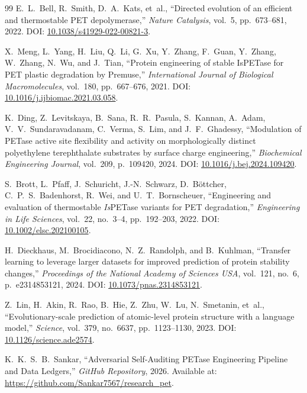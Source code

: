 \documentclass[11pt,a4paper]{article}
\begin{document}
\begin{thebibliography}{99}
E.~L.~Bell, R.~Smith, D.~A.~Kats, et~al.,
``Directed evolution of an efficient and thermostable PET depolymerase,''
\textit{Nature Catalysis}, vol.~5, pp.~673--681, 2022.
\newblock DOI: \href{https://doi.org/10.1038/s41929-022-00821-3}{10.1038/s41929-022-00821-3}.

X.~Meng, L.~Yang, H.~Liu, Q.~Li, G.~Xu, Y.~Zhang, F.~Guan, Y.~Zhang, W.~Zhang, N.~Wu, and J.~Tian,
``Protein engineering of stable IsPETase for PET plastic degradation by Premuse,''
\textit{International Journal of Biological Macromolecules}, vol.~180, pp.~667--676, 2021.
\newblock DOI: \href{https://doi.org/10.1016/j.ijbiomac.2021.03.058}{10.1016/j.ijbiomac.2021.03.058}.

K.~Ding, Z.~Levitskaya, B.~Sana, R.~R.~Pasula, S.~Kannan, A.~Adam, V.~V.~Sundaravadanam, C.~Verma, S.~Lim, and J.~F.~Ghadessy,
``Modulation of PETase active site flexibility and activity on morphologically distinct polyethylene terephthalate substrates by surface charge engineering,''
\textit{Biochemical Engineering Journal}, vol.~209, p.~109420, 2024.
\newblock DOI: \href{https://doi.org/10.1016/j.bej.2024.109420}{10.1016/j.bej.2024.109420}.

S.~Brott, L.~Pfaff, J.~Schuricht, J.-N.~Schwarz, D.~B\"ottcher, C.~P.~S.~Badenhorst, R.~Wei, and U.~T.~Bornscheuer,
``Engineering and evaluation of thermostable \textit{Is}PETase variants for PET degradation,''
\textit{Engineering in Life Sciences}, vol.~22, no.~3--4, pp.~192--203, 2022.
\newblock DOI: \href{https://doi.org/10.1002/elsc.202100105}{10.1002/elsc.202100105}.

H.~Dieckhaus, M.~Brocidiacono, N.~Z.~Randolph, and B.~Kuhlman,
``Transfer learning to leverage larger datasets for improved prediction of protein stability changes,''
\textit{Proceedings of the National Academy of Sciences USA}, vol.~121, no.~6, p.~e2314853121, 2024.
\newblock DOI: \href{https://doi.org/10.1073/pnas.2314853121}{10.1073/pnas.2314853121}.

Z.~Lin, H.~Akin, R.~Rao, B.~Hie, Z.~Zhu, W.~Lu, N.~Smetanin, et~al.,
``Evolutionary-scale prediction of atomic-level protein structure with a language model,''
\textit{Science}, vol.~379, no.~6637, pp.~1123--1130, 2023.
\newblock DOI: \href{https://doi.org/10.1126/science.ade2574}{10.1126/science.ade2574}.

K.~K.~S.~B.~Sankar,
``Adversarial Self-Auditing PETase Engineering Pipeline and Data Ledgers,''
\textit{GitHub Repository}, 2026.
\newblock Available at: \url{https://github.com/Sankar7567/research_pet}.

\end{thebibliography}
\end{document}
